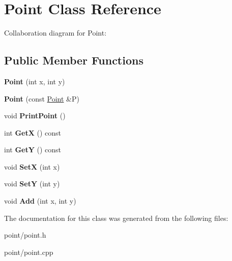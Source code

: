 \hypertarget{classPoint}{}\section{Point Class Reference}
\label{classPoint}


Collaboration diagram for Point\+:
\subsection*{Public Member Functions}
\begin{DoxyCompactItemize}
\item 
{\bfseries Point} (int x, int y)\hypertarget{classPoint_a001c4958c310b248f5c26037aea38a9c}{}\label{classPoint_a001c4958c310b248f5c26037aea38a9c}

\item 
{\bfseries Point} (const \hyperlink{classPoint}{Point} \&P)\hypertarget{classPoint_a7e32c5a7f878c49ed9f1777b622cc06c}{}\label{classPoint_a7e32c5a7f878c49ed9f1777b622cc06c}

\item 
void {\bfseries Print\+Point} ()\hypertarget{classPoint_ad2e6d7c6a90569ef3abf78a62ab195d6}{}\label{classPoint_ad2e6d7c6a90569ef3abf78a62ab195d6}

\item 
int {\bfseries GetX} () const \hypertarget{classPoint_a17268f57fa918fa8119e96f014573902}{}\label{classPoint_a17268f57fa918fa8119e96f014573902}

\item 
int {\bfseries GetY} () const \hypertarget{classPoint_a1b715f6d7008f2ef92e57135b8443987}{}\label{classPoint_a1b715f6d7008f2ef92e57135b8443987}

\item 
void {\bfseries SetX} (int x)\hypertarget{classPoint_a1373526d6a2e4326b8692c22c8380bc7}{}\label{classPoint_a1373526d6a2e4326b8692c22c8380bc7}

\item 
void {\bfseries SetY} (int y)\hypertarget{classPoint_ad10ec0ed7743557f5cefa3c0ce4273e8}{}\label{classPoint_ad10ec0ed7743557f5cefa3c0ce4273e8}

\item 
void {\bfseries Add} (int x, int y)\hypertarget{classPoint_a63a534da44ebf1c64f856672884f8268}{}\label{classPoint_a63a534da44ebf1c64f856672884f8268}

\end{DoxyCompactItemize}


The documentation for this class was generated from the following files\+:\begin{DoxyCompactItemize}
\item 
point/point.\+h\item 
point/point.\+cpp\end{DoxyCompactItemize}
